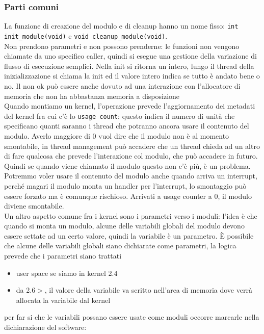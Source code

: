 \documentclass[12pt, oneside]{extbook}
\begin{document}
\subsubsection{Parti comuni}
La funzione di creazione del modulo e di cleanup hanno un nome fisso: \texttt{int init\_module(void)} e \texttt{void cleanup\_module(void)}.\\Non prendono parametri e non possono prenderne: le funzioni non vengono chiamate da uno specifico caller, quindi si esegue una gestione della variazione di flusso di esecuzione semplici. Nella init si ritorna un intero, lungo il thread della inizializzazione si chiama la init ed il valore intero indica se tutto è andato bene o no. Il non ok può essere anche dovuto ad una interazione con l'allocatore di memoria che non ha abbastanza memoria a disposizione\\Quando montiamo  un kernel, l'operazione prevede l'aggiornamento dei metadati del kernel fra cui c'è lo \texttt{usage count}: questo indica il numero di unità che specificano quanti saranno i thread che potranno ancora usare il contenuto del modulo. Averlo maggiore di 0 vuol dire che il modulo non è al momento smontabile, in thread management può accadere che un thread chieda ad un altro di fare qualcosa che prevede l'interazione col modulo, che può accadere in futuro. Quindi se quando viene chiamato il modulo questo non c'è più, è un problema.\\Potremmo voler usare il contenuto del modulo anche quando arriva un interrupt, perché magari il modulo monta un handler per l'interrupt, lo smontaggio può essere forzato ma è comunque rischioso. Arrivati a usage counter a 0, il modulo diviene smontabile.\\ Un altro aspetto comune fra i kernel sono i parametri verso i moduli: l'idea è che quando si monta un modulo, alcune delle variabili globali del modulo devono essere settate ad un certo valore, quindi la variabile è un parametro. È possibile che alcune delle variabili globali siano dichiarate come parametri, la logica prevede che i parametri siano trattati 
\begin{itemize}
\item user space se siamo in kernel 2.4
\item da 2.6$>$, il valore della variabile va scritto nell'area di memoria dove verrà allocata la variabile dal kernel
\end{itemize}
per far si che le variabili possano essere usate come moduli occorre marcarle nella dichiarazione del software:
\end{document}
